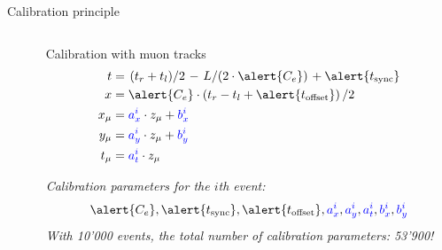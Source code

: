 \documentclass[compress, 13pt, aspectratio=169]{beamer}
\newcommand{\slfrac}[2]{\left.#1\middle/#2\right.}
\begin{document}
\begin{frame}[fragile,t]{Calibration principle}
\begin{columns}[t]
\begin{column}{0.45 \textwidth}
{			}
		\end{column}
		\pause
		\begin{column}{0.48 \textwidth}
			\begin{block}{Calibration with muon tracks}
				\vspace*{-1.5em}
				\begin{align}
					\small
					t     & = \slfrac{(t_r + t_l)}{2} - \slfrac{L}{(2 \cdot \alert{C_e})} + \alert{t_\text{sync}} \\
					x     & = \alert{C_e}\cdot \left( t_r - t_l  + \alert{t_\text{offset}} \right) / 2            \\
					x_\mu & = \textcolor{blue}{a^i_x} \cdot z_\mu  + \textcolor{blue}{b^i_x}                      \\
					y_\mu & = \textcolor{blue}{a^i_y} \cdot z_\mu  + \textcolor{blue}{b^i_y}                      \\
					t_\mu & = \textcolor{blue}{a^i_t} \cdot z_\mu
				\end{align}
			\end{block}
			\textit{Calibration parameters for the $i$th event:}
			$$\alert{C_e}, \alert{t_\text{sync}}, \alert{t_\text{offset}}, \textcolor{blue}{a^i_x}, \textcolor{blue}{a^i_y}, \textcolor{blue}{a^i_t}, \textcolor{blue}{b^i_x}, \textcolor{blue}{b^i_y}$$
			\pause
			\vspace*{1em}
			\textit{With 10'000 events, the total number of calibration parameters: \alert{\huge 53'900!}}
		\end{column}

	\end{columns}
\end{frame}
\end{document}
